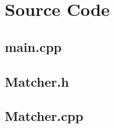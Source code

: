 \section{Source Code}



\subsection{main.cpp}
\label{app:main_cpp}

\bigskip
\bigskip

\subsection{Matcher.h}
\label{app:matcher_h}

\bigskip
\bigskip

\subsection{Matcher.cpp}
\label{app:matcher_cpp}

\bigskip
\bigskip